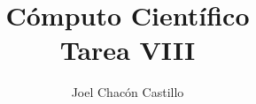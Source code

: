 \documentclass[preprint,12pt]{elsarticle}
\begin{document}
\begin{frontmatter}


\title{Cómputo Científico \\ Tarea VIII}




\author{Joel Chac\'on Castillo}

\address{Guanajuato, M\'exico}
\end{frontmatter}
\end{document}
